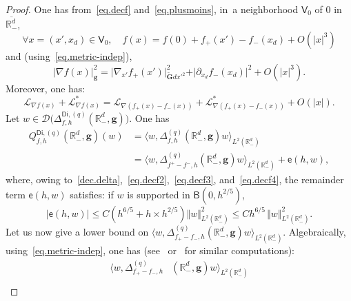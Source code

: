 \documentclass[10pt]{amsart}
\newcommand{\mbf}[1]{\mathbf{#1}}
\let\lp\langle
\let\rp\rangle
\theoremstyle{plain}
\theoremstyle{definition}
\begin{document}
\begin{proof}

One has from~\eqref{eq.decf} and~\eqref{eq.plusmoins}, in~a neighborhood $ \mathsf V_0$ of $0$ in $\overline{\mathbb R^d_-}$, \begin{equation}\label{eq.decf2}
\forall x=(x',x_d)\in \mathsf V_0,\quad f(x)=f(0)+ f_+(x')- f_-(x_d) +O(\vert x\vert^3)
\end{equation}
and (using~\eqref{eq.metric-indep}),
\begin{equation}\label{eq.decf3}
\vert \nabla f(x)\vert_{{\mbf g}}^2= \vert \nabla_{x'} f_+(x')\vert_{\tilde {\mbf G}dx'^2}^2 + \vert \partial_{x_d} f_-(x_d)\vert^2 +O(\vert x\vert^3).
\end{equation}
Moreover, one has:
\begin{equation}\label{eq.decf4}
\mathcal L_{\nabla f(x)}+ \mathcal L_{\nabla f(x)}^*= \mathcal L_{\nabla (f_+(x)-f_-(x))}+ \mathcal L_{\nabla (f_+(x)-f_-(x))}^*+ O(\vert x \vert).
\end{equation}
Let $w\in \mathcal D\bigl(\Delta_{f,h}^{\mathsf{Di},(q)}(\mathbb R_-^d, \mbf g) \bigr)$.
One has
\begin{equation}\label{eq.ref1}
\begin{aligned}
Q_{f,h}^{\mathsf{Di},(q)}(\mathbb R^d_-, \mbf g)(w)&=\lp w,
\Delta_{f,h}^{(q)}(\mathbb
R^d_-, \mbf g)
w\rp_{L^2(\mathbb
R^d_-)}\\
&=\lp w, \Delta_{f^+-f^-,h}^{(q)}(\mathbb R^d_-, \mbf g)
w\rp_{L^2(\mathbb
R^d_-)} + \mathsf e(h,w),
\end{aligned}
\end{equation}
where, owing
to~\eqref{dec.delta},~\eqref{eq.decf2},~\eqref{eq.decf3},
and~\eqref{eq.decf4}, the remainder term $\mathsf e(h,w)$ satisfies: if $w$ is supported in $\mathsf B(0,h^{2/5 })$,
\begin{equation}\label{taux-erreur}
\vert \mathsf e(h,w)\vert \le C (h^{6/5}+ h\times h^{2/5}) \Vert w \Vert_{L^2(\mathbb R^d_-)}^2\le Ch^{6/5}\, \Vert w \Vert_{L^2(\mathbb R^d_-)}^2.
\end{equation}
Let us now give a lower bound on $ \lp w,\Delta^{(q)}_{f_+-f_-,h}(\mathbb R^d_-, \mbf g)w\rp_{L^2(\mathbb R^d_-)}$.
Algebraically, using~\eqref{eq.metric-indep}, one has
(see~\cite[Eq.\,(3.17)]{helffer-nier-06} or~\cite[Eq.\,(4.3.16)]{le-peutrec-10}
for similar computations):
\begin{align}
\label{eq.dec55}
\lp w,\Delta^{(q)}_{f_+-f_-,h}&(\mathbb R^d_-, \mbf g)w\rp_{L^2(\mathbb R^d_-)}\\
\nonumber

\end{align}
\end{proof}
\end{document}
